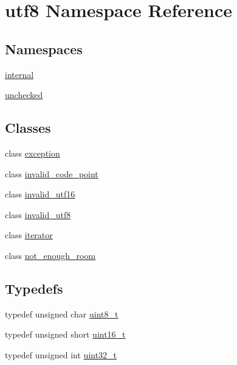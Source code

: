 \hypertarget{namespaceutf8}{}\section{utf8 Namespace Reference}
\label{namespaceutf8}
\subsection*{Namespaces}
\begin{DoxyCompactItemize}
\item 
 \hyperlink{namespaceutf8_1_1internal}{internal}
\item 
 \hyperlink{namespaceutf8_1_1unchecked}{unchecked}
\end{DoxyCompactItemize}
\subsection*{Classes}
\begin{DoxyCompactItemize}
\item 
class \hyperlink{classutf8_1_1exception}{exception}
\item 
class \hyperlink{classutf8_1_1invalid__code__point}{invalid\+\_\+code\+\_\+point}
\item 
class \hyperlink{classutf8_1_1invalid__utf16}{invalid\+\_\+utf16}
\item 
class \hyperlink{classutf8_1_1invalid__utf8}{invalid\+\_\+utf8}
\item 
class \hyperlink{classutf8_1_1iterator}{iterator}
\item 
class \hyperlink{classutf8_1_1not__enough__room}{not\+\_\+enough\+\_\+room}
\end{DoxyCompactItemize}
\subsection*{Typedefs}
\begin{DoxyCompactItemize}
\item 
typedef unsigned char \hyperlink{namespaceutf8_abe793b552fabe390d134b97ab81d2c7f}{uint8\+\_\+t}
\item 
typedef unsigned short \hyperlink{namespaceutf8_ac23066b92c5a1d9d9ef177201f750936}{uint16\+\_\+t}
\item 
typedef unsigned int \hyperlink{namespaceutf8_a846259d2f173d524282583fc9d825b00}{uint32\+\_\+t}
\end{DoxyCompactItemize}
